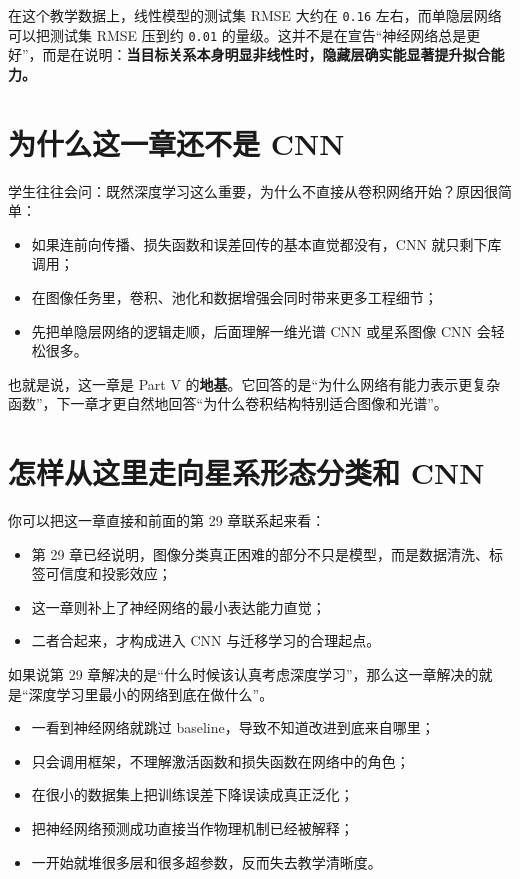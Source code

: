 在这个教学数据上，线性模型的测试集 RMSE 大约在 \texttt{0.16} 左右，而单隐层网络可以把测试集 RMSE 压到约 \texttt{0.01} 的量级。这并不是在宣告“神经网络总是更好”，而是在说明：\textbf{当目标关系本身明显非线性时，隐藏层确实能显著提升拟合能力。}

\section{为什么这一章还不是 CNN}

学生往往会问：既然深度学习这么重要，为什么不直接从卷积网络开始？原因很简单：

\begin{itemize}
    \item 如果连前向传播、损失函数和误差回传的基本直觉都没有，CNN 就只剩下库调用；
    \item 在图像任务里，卷积、池化和数据增强会同时带来更多工程细节；
    \item 先把单隐层网络的逻辑走顺，后面理解一维光谱 CNN 或星系图像 CNN 会轻松很多。
\end{itemize}

也就是说，这一章是 Part V 的\textbf{地基}。它回答的是“为什么网络有能力表示更复杂函数”，下一章才更自然地回答“为什么卷积结构特别适合图像和光谱”。

\section{怎样从这里走向星系形态分类和 CNN}

你可以把这一章直接和前面的第 29 章联系起来看：

\begin{itemize}
    \item 第 29 章已经说明，图像分类真正困难的部分不只是模型，而是数据清洗、标签可信度和投影效应；
    \item 这一章则补上了神经网络的最小表达能力直觉；
    \item 二者合起来，才构成进入 CNN 与迁移学习的合理起点。
\end{itemize}

如果说第 29 章解决的是“什么时候该认真考虑深度学习”，那么这一章解决的就是“深度学习里最小的网络到底在做什么”。

\begin{warnbox}[神经网络入门中的常见误区]
\begin{itemize}
    \item 一看到神经网络就跳过 baseline，导致不知道改进到底来自哪里；
    \item 只会调用框架，不理解激活函数和损失函数在网络中的角色；
    \item 在很小的数据集上把训练误差下降误读成真正泛化；
    \item 把神经网络预测成功直接当作物理机制已经被解释；
    \item 一开始就堆很多层和很多超参数，反而失去教学清晰度。
\end{itemize}
\end{warnbox}

